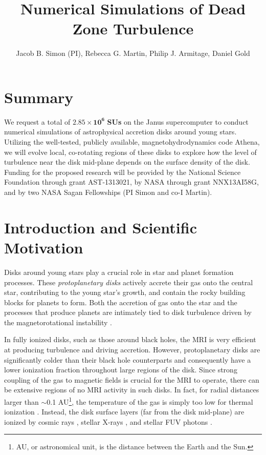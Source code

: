 \documentclass[preprint]{aastex}
\begin{document}
\title{\LARGE \bf Numerical Simulations of Dead Zone Turbulence}
\author{\large Jacob B. Simon (PI), Rebecca G. Martin, Philip J. Armitage, Daniel Gold}
\maketitle
\vspace{-8mm}
\section{Summary}
We request a total of $\mathbf{2.85\times10^6}$ {\bf SUs} on the {\sc Janus} supercomputer to conduct numerical simulations of astrophysical accretion disks around young stars.
Utilizing the well-tested, publicly available, magnetohydrodynamics code {\sc Athena}, we will evolve local, co-rotating regions of these disks to explore how the level of turbulence near the disk mid-plane depends on the surface density of the disk.  Funding for the proposed research will be provided by the National Science Foundation through grant AST-1313021, by NASA through grant NNX13AI58G, and by two NASA Sagan Fellowships (PI Simon and co-I Martin). 

\vspace{-8mm}
\section{Introduction and Scientific Motivation}
\vspace{-2mm}
Disks around young stars play a crucial role in star and planet formation processes.  These {\it protoplanetary disks} actively accrete their gas onto the central star, contributing to the young star's growth, and contain the rocky building blocks for planets to form.  
Both the accretion of gas onto the star and the processes that produce planets are intimately tied to {disk turbulence} driven by the magnetorotational instability \cite[MRI;][]{balbus91,balbus98}.  

In fully ionized disks, such as those around black holes, the MRI is very efficient at producing turbulence and driving accretion.  However, protoplanetary disks are significantly colder than their black hole counterparts and consequently have a lower ionization fraction throughout large regions of the disk.  Since strong coupling of the gas to magnetic fields is crucial for the MRI to operate, there can be extensive regions of no MRI activity in such disks.  In fact, for radial distances larger than $\sim$0.1 AU\footnote{AU, or astronomical unit, is the distance between the Earth and the Sun.}, the temperature of the gas is simply too low for thermal ionization \citep{umebayashi83}.  Instead, the disk surface layers (far from the disk mid-plane) are ionized by cosmic rays \citep{gammie96}, stellar X-rays \citep{igea99}, and stellar FUV photons \citep{perez-becker11b}.
\end{document}
